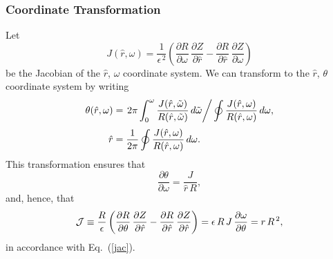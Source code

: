 \documentclass[12pt,prb,aps]{revtex4-1}
\begin{document}
\subsubsection{Coordinate Transformation}
Let
\begin{equation}
J(\hat{r},\omega) = \frac{1}{\epsilon^{\,2}}\left(\frac{\partial R}{\partial\omega}\,\frac{\partial Z}{\partial \hat{r}} -\frac{\partial R}{\partial \hat{r}}\,\frac{\partial Z}{\partial \omega}\right)
\end{equation}
be the Jacobian of the $\hat{r}$, $\omega$ coordinate system. We can transform to the $\hat{r}$, $\theta$ coordinate system 
by writing
\begin{align}\label{e11}
\theta(\hat{r},\omega) &= \left.2\pi\int_0^\omega \frac{J(\hat{r},\tilde{\omega})}{R(\hat{r},\tilde{\omega})}\,d\tilde{\omega}\right/\oint\frac{J(\hat{r},\omega)}{R(\hat{r},\omega)}\,d\omega,\\[0.5ex]
\hat{r}&=\frac{1}{2\pi}\oint\frac{J(\hat{r},\omega)}{R(\hat{r},\omega)}\,d\omega.\label{e12}
\end{align}
This transformation ensures that 
\begin{equation}
\frac{\partial\theta}{\partial\omega} = \frac{J}{\hat{r}\,R},
\end{equation}
and, hence, that 
\begin{equation}
{\cal J} \equiv \frac{R}{\epsilon} \left(\frac{\partial R}{\partial\theta}\,\frac{\partial Z}{\partial \hat{r}} -\frac{\partial R}{\partial \hat{r}}\,\frac{\partial Z}{\partial \hat{r}}\right)
=\epsilon\, R\,J\,\frac{\partial\omega}{\partial\theta} =r\,R^{\,2},
\end{equation}
in accordance with Eq.~(\ref{jac}). 
\end{document}
